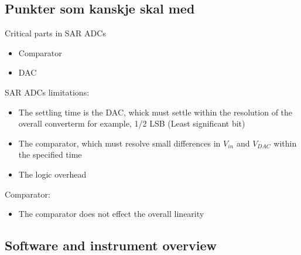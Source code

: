 \documentclass[english, 12pt, a4paper]{article}
\begin{document}
\section{Punkter som kanskje skal med}
Critical parts in SAR ADCs 

\begin{itemize}
 \item Comparator
 \item DAC
\end{itemize}

SAR ADCs limitations:

\begin{itemize}
 \item The settling time is the DAC, whick must settle within the resolution of the overall converterm for example, 1/2 LSB (Least significant bit)
 \item The comparator, which must resolve small differences in $V_{in}$ and $V_{DAC}$ within the specified time
 \item The logic overhead

 \end{itemize}
Comparator:

\begin{itemize}
 \item The comparator does not effect the overall linearity 
\end{itemize}


\begin{appendices}
\chapter{Software and instrument overview}
\end{appendices}

\printbibliography{}
\end{document}
